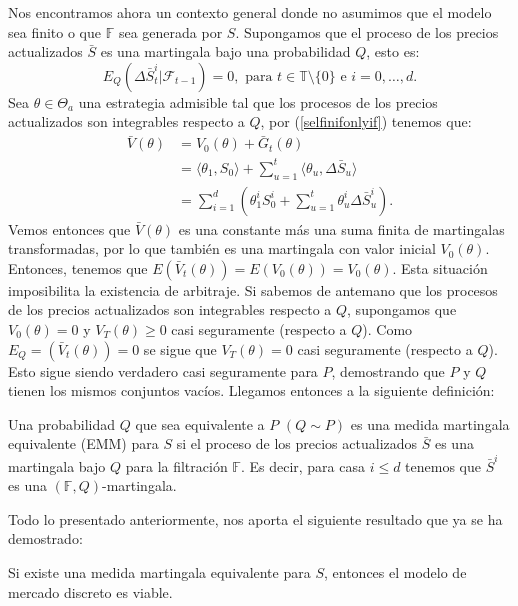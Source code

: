 Nos encontramos ahora un contexto general donde no asumimos que el modelo sea finito o que $ \mathbb{F} $ sea generada por $ S $. Supongamos que el proceso de los precios actualizados $ \bar{S} $ es una martingala bajo una probabilidad $ Q $, esto es:
\[
E_Q (\Delta \bar{S}^i_t | \mathcal{F}_{t-1}) = 0, \text{ para } t \in \mathbb{T}\setminus \{0\} \text{ e } i = 0,\dots,d.
\]
Sea $ \theta \in \Theta_a $ una estrategia admisible tal que los procesos de los precios actualizados son integrables respecto a $ Q $, por (\ref{selfinifonlyif}) tenemos que:
\begin{equation*}
\begin{split}
\bar{V}(\theta) &= V_0(\theta) + \bar{G}_t(\theta) \\
&= \langle \theta_{1}, S_0 \rangle + \sum_{u=1}^{t} \langle \theta_{u}, \Delta \bar{S}_u \rangle \\
&= \sum_{i=1}^{d}(\theta_1^i S_0^i + \sum_{u=1}^{t} \theta_{u}^i \Delta \bar{S}_u^i).
\end{split}
\end{equation*}
Vemos entonces que $ \bar{V}(\theta) $ es una constante más una suma finita de martingalas transformadas, por lo que también es una martingala con valor inicial $ V_0 (\theta) $. Entonces, tenemos que $ E(\bar{V}_t (\theta)) = E(V_0 (\theta)) = V_0(\theta) $. Esta situación imposibilita la existencia de arbitraje. Si sabemos de antemano que los procesos de los precios actualizados son integrables respecto a $ Q $, supongamos que $ V_0 (\theta) = 0$ y $ V_T (\theta) \geq 0$ casi seguramente (respecto a $ Q $). Como $ E_Q = (\bar{V}_t ( \theta)) = 0 $ se sigue que $ V_T(\theta) = 0$ casi seguramente (respecto a $ Q $). Esto sigue siendo verdadero casi seguramente para $ P $, demostrando que $ P $ y $ Q $ tienen los mismos conjuntos vacíos. Llegamos entonces a la siguiente definición:
\begin{definicion}
Una probabilidad $ Q $ que sea equivalente a $ P $ $ (Q\sim P) $ es una medida martingala equivalente (EMM) para $ S $ si el proceso de los precios actualizados $ \bar{S} $ es una martingala bajo $ Q $ para la filtración $ \mathbb{F} $. Es decir, para casa $ i \leq d $ tenemos que $ \bar{S}^i $ es una $ (\mathbb{F},Q) $-martingala.
\end{definicion}

Todo lo presentado anteriormente, nos aporta el siguiente resultado que ya se ha demostrado:
\begin{proposicionBox}\label{martThenViab}
Si existe una medida martingala equivalente para $ S $, entonces el modelo de mercado discreto es viable.	
\end{proposicionBox}

